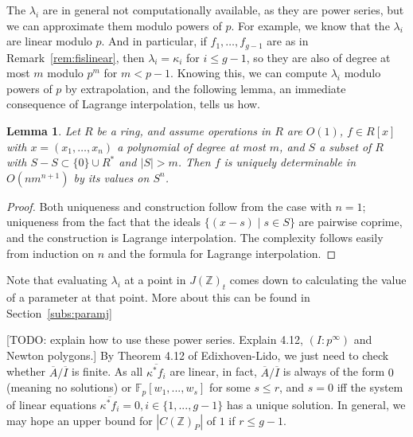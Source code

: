 \documentclass[12pt]{article}
\newcommand{\Z}{\mathbb{Z}}
\newcommand{\F}{\mathbb{F}}
\theoremstyle{plain}
\newtheorem{lem}[thm]{Lemma} %
\theoremstyle{definition}
\theoremstyle{remark}
\begin{document}
The $\lambda_i$ are in general not computationally available, as they are power series, but we can approximate them modulo powers of $p$. For example, we know that the $\lambda_i$ are linear modulo $p$. And in particular, if $f_1,\dots,f_{g-1}$ are as in Remark~\ref{rem:fislinear}, then $\lambda_i = \kappa_i$ for $i \leq g-1$, so they are also of degree at most $m$ modulo $p^m$ for $m < p-1$. Knowing this, we can compute $\lambda_i$ modulo powers of $p$ by extrapolation, and the following lemma, an immediate consequence of Lagrange interpolation, tells us how.
\begin{lem}
\label{lem:interpolate}
Let $R$ be a ring, and assume operations in $R$ are $O(1)$, $f \in R[x]$ with $x = (x_1,\dots,x_n)$ a polynomial of degree at most $m$, and $S$ a subset of $R$ with $S-S \subset \{0\} \cup R^*$ and $|S| > m$. Then $f$ is uniquely determinable in $O(nm^{n+1})$ by its values on $S^n$.
\end{lem}
\begin{proof}
Both uniqueness and construction follow from the case with $n=1$; uniqueness from the fact that the ideals $\{(x-s) \mid s \in S\}$ are pairwise coprime, and the construction is Lagrange interpolation. The complexity follows easily from induction on $n$ and the formula for Lagrange interpolation.
\end{proof}

Note that evaluating $\lambda_i$ at a point in $J(\Z)_t$ comes down to calculating the value of a parameter at that point. More about this can be found in Section~\ref{subs:paramj}

[TODO: explain how to use these power series. Explain 4.12, $(I : p^\infty)$ and Newton polygons.]
By Theorem 4.12 of Edixhoven-Lido, we just need to check whether $\overline{A}/\overline{I}$ is finite. As all $\overline{\kappa^* f_i}$ are linear, in fact, $\overline{A}/\overline{I}$ is always of the form $0$ (meaning no solutions) or $\F_p[w_1,...,w_s]$ for some $s \leq r$, and $s = 0$ iff the system of linear equations $\overline{\kappa^* f_i} = 0, i \in \{1,...,g-1\}$ has a unique solution. In general, we may hope an upper bound for $|C(\Z)_P|$ of $1$ if $r \leq g-1$.
\end{document}
